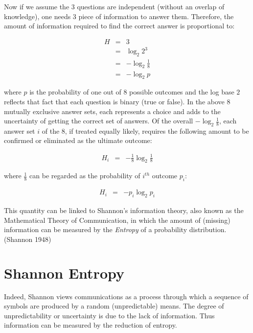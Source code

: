 \documentclass[
  letterpaper,
]{scrbook}
\begin{document}
\protect{}\label{tab-info-quiz}{}

Now if we assume the \(3\) questions are independent (without an overlap
of knowledge), one needs \(3\) piece of information to answer them.
Therefore, the amount of information required to find the correct answer
is proportional to:

\[\begin{aligned}
  H
  & = & 3 \\
  & = & \log_2 2^3 \\
  & = & - \log_2 \frac{1}{8} \\
  & = & - \log_2 p
\end{aligned}\]

where \(p\) is the probability of one out of \(8\) possible outcomes and
the log base \(2\) reflects that fact that each question is binary (true
or false). In the above \(8\) mutually exclusive answer sets, each
represents a choice and adds to the uncertainty of getting the correct
set of answers. Of the overall \(-\log_2 \frac{1}{8}\), each answer set
\(i\) of the \(8\), if treated equally likely, requires the following
amount to be confirmed or eliminated as the ultimate outcome:

\[\begin{aligned}
H_i
& = & - \frac{1}{8} \log_2 \frac{1}{8}
\end{aligned}\]

where \(\frac{1}{8}\) can be regarded as the probability of \(i^{th}\)
outcome \(p_i\):

\[\begin{aligned}
H_i
& = & - p_i \log_2 p_i
\end{aligned}\]

This quantity can be linked to Shannon's information theory, also known
as the Mathematical Theory of Communication, in which the amount of
(missing) information can be measured by the \emph{Entropy} of a
probability distribution.(Shannon 1948)

\section{Shannon Entropy}\label{shannon-entropy}

Indeed, Shannon views communications as a process through which a
sequence of symbols are produced by a random (unpredictable) means. The
degree of unpredictability or uncertainty is due to the lack of
information. Thus information can be measured by the reduction of
entropy.
\end{document}
